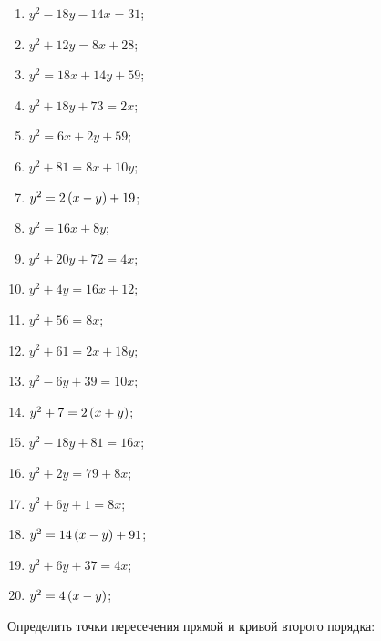 	\begin{multicols}{2}
		\begin{enumerate}
			\setcounter{enumi}{\value{tasks}}

			\item \( y^2 - 18 y - 14 x = 31 \);
			\item \( y^2 + 12 y = 8x + 28 \);
			\item \( y^2 = 18 x + 14 y + 59 \);
			\item \( y^2 + 18 y + 73 = 2 x \);
			\item \( y^2 = 6 x + 2 y + 59 \);
			\item \( y^2 + 81 = 8 x + 10 y \);
			\item \( y^2 = 2 \left( x - y \right) + 19 \);
			\item \( y^2 = 16 x + 8 y \);
			\item \( y^2 + 20 y + 72 = 4 x \);
			\item \( y^2 + 4 y = 16 x + 12 \);
			\item \( y^2 + 56 = 8 x \);
			\item \( y^2 + 61 = 2 x + 18 y \);
			\item \( y^2 - 6 y + 39 = 10 x \);
			\item \( y^2 + 7 = 2 \left( x + y \right) \);
			\item \( y^2 - 18 y + 81 = 16 x \);
			\item \( y^2 + 2 y = 79 + 8 x \);
			\item \( y^2 + 6 y + 1 = 8 x \);
			\item \( y^2 = 14 \left( x - y \right) + 91 \);
			\item \( y^2 + 6 y + 37 = 4 x \);
			\item \( y^2 = 4 \left( x - y \right) \);

			\setcounter{tasks}{\value{enumi}}
		\end{enumerate}
	\end{multicols}
	
	\vspace{15pt}
	Определить точки пересечения прямой и кривой второго порядка:

